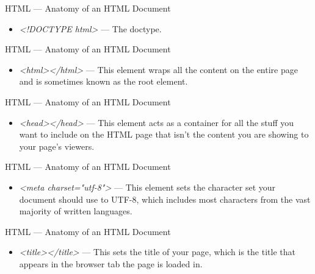 \documentclass[aspectratio=169]{beamer}
\begin{document}
\begin{darkframes}
    \begin{frame}{HTML — Anatomy of an HTML Document}
        \firstWebPage
        \begin{itemize}
            \item \textit{<!DOCTYPE html>} — The doctype.
        \end{itemize}
    \end{frame}
    
    \begin{frame}{HTML — Anatomy of an HTML Document}
        \firstWebPage
        \begin{itemize}
            \item \textit{<html></html>} — This element wraps all the content on the entire page and is sometimes known as the root element.
        \end{itemize}
    \end{frame}
    
    \begin{frame}{HTML — Anatomy of an HTML Document}
        \firstWebPage
        \begin{itemize}
            \item \textit{<head></head>} — This element acts as a container for all the stuff you want to include on the HTML page that isn't the content you are showing to your page's viewers.
        \end{itemize}
    \end{frame}
    
    \begin{frame}{HTML — Anatomy of an HTML Document}
        \firstWebPage
        \begin{itemize}
            \item \textit{<meta charset="utf-8">} — This element sets the character set your document should use to UTF-8, which includes most characters from the vast majority of written languages.
        \end{itemize}
    \end{frame}
    
    \begin{frame}{HTML — Anatomy of an HTML Document}
        \firstWebPage
        \begin{itemize}
            \item \textit{<title></title>} — This sets the title of your page, which is the title that appears in the browser tab the page is loaded in.
        \end{itemize}
    \end{frame}
    

\end{darkframes}
\end{document}
